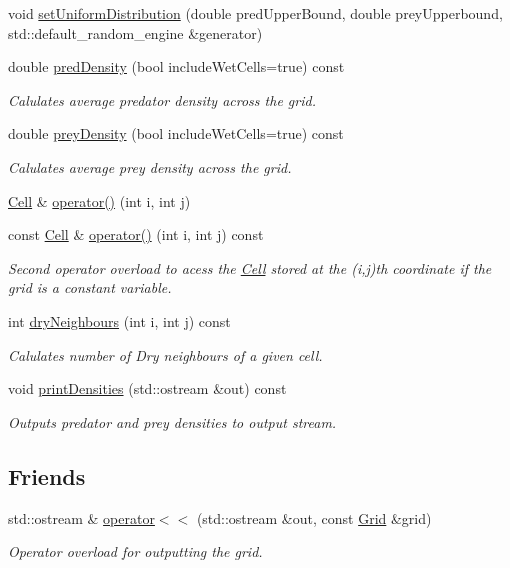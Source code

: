 \begin{DoxyCompactItemize}
$$\item 
void \hyperlink{class_grid_a17c062fcf4063a811bd8d95c32bce723}{set\+Uniform\+Distribution} (double pred\+Upper\+Bound, double prey\+Upperbound, std\+::default\+\_\+random\+\_\+engine \&generator)
\item 
double \hyperlink{class_grid_a25eeb1fef1d86fe74b45e615f0376158}{pred\+Density} (bool include\+Wet\+Cells=true) const
\begin{DoxyCompactList}\small\item\em Calulates average predator density across the grid. \end{DoxyCompactList}\item 
double \hyperlink{class_grid_a7dc8ae18c31e8e680f6369d7c07ea881}{prey\+Density} (bool include\+Wet\+Cells=true) const
\begin{DoxyCompactList}\small\item\em Calulates average prey density across the grid. \end{DoxyCompactList}\item 
\hyperlink{class_cell}{Cell} \& \hyperlink{class_grid_aed06be122077b3a0c1fe7c412c2535fc}{operator()} (int i, int j)
\item 
const \hyperlink{class_cell}{Cell} \& \hyperlink{class_grid_aa89f5c17cb78658f3b82a3b2d93aeb92}{operator()} (int i, int j) const
\begin{DoxyCompactList}\small\item\em Second operator overload to acess the \hyperlink{class_cell}{Cell} stored at the (i,j)th coordinate if the grid is a constant variable. \end{DoxyCompactList}\item 
int \hyperlink{class_grid_a50f4c0db20b466c84a1d65004e51642e}{dry\+Neighbours} (int i, int j) const
\begin{DoxyCompactList}\small\item\em Calulates number of Dry neighbours of a given cell. \end{DoxyCompactList}\item 
void \hyperlink{class_grid_a4971cb9d47440bc63488993d5647f943}{print\+Densities} (std\+::ostream \&out) const
\begin{DoxyCompactList}\small\item\em Outputs predator and prey densities to output stream. \end{DoxyCompactList}\end{DoxyCompactItemize}
\subsection*{Friends}
\begin{DoxyCompactItemize}
\item 
std\+::ostream \& \hyperlink{class_grid_a3513576c9cced69b185e4be8fe248e8c}{operator$<$$<$} (std\+::ostream \&out, const \hyperlink{class_grid}{Grid} \&grid)
\begin{DoxyCompactList}\small\item\em Operator overload for outputting the grid. \end{DoxyCompactList}\end{DoxyCompactItemize}


